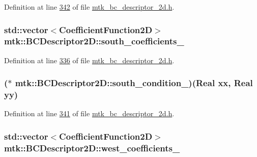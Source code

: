 Definition at line \hyperlink{mtk__bc__descriptor__2d_8h_source_l00342}{342} of file \hyperlink{mtk__bc__descriptor__2d_8h_source}{mtk\+\_\+bc\+\_\+descriptor\+\_\+2d.\+h}.

\hypertarget{classmtk_1_1BCDescriptor2D_a263309b9ad288dc89826d818d9378d07}{
\subsubsection[{south\+\_\+coefficients\+\_\+}]{\setlength{\rightskip}{0pt plus 5cm}std\+::vector$<${\bf Coefficient\+Function2\+D}$>$ mtk\+::\+B\+C\+Descriptor2\+D\+::south\+\_\+coefficients\+\_\+\hspace{0.3cm}{\ttfamily [private]}}}\label{classmtk_1_1BCDescriptor2D_a263309b9ad288dc89826d818d9378d07}


Definition at line \hyperlink{mtk__bc__descriptor__2d_8h_source_l00336}{336} of file \hyperlink{mtk__bc__descriptor__2d_8h_source}{mtk\+\_\+bc\+\_\+descriptor\+\_\+2d.\+h}.

\hypertarget{classmtk_1_1BCDescriptor2D_a2a933b473abbe47ad7c79ef7939e7768}{
\subsubsection[{south\+\_\+condition\+\_\+}]{($\ast$ mtk\+::\+B\+C\+Descriptor2\+D\+::south\+\_\+condition\+\_\+)({\bf Real} xx, {\bf Real} yy)\hspace{0.3cm}{\ttfamily [private]}}}\label{classmtk_1_1BCDescriptor2D_a2a933b473abbe47ad7c79ef7939e7768}


Definition at line \hyperlink{mtk__bc__descriptor__2d_8h_source_l00341}{341} of file \hyperlink{mtk__bc__descriptor__2d_8h_source}{mtk\+\_\+bc\+\_\+descriptor\+\_\+2d.\+h}.

\hypertarget{classmtk_1_1BCDescriptor2D_a7df71b43acc25c468683075cc7790bb2}{
\subsubsection[{west\+\_\+coefficients\+\_\+}]{\setlength{\rightskip}{0pt plus 5cm}std\+::vector$<${\bf Coefficient\+Function2\+D}$>$ mtk\+::\+B\+C\+Descriptor2\+D\+::west\+\_\+coefficients\+\_\+\hspace{0.3cm}{\ttfamily [private]}}}\label{classmtk_1_1BCDescriptor2D_a7df71b43acc25c468683075cc7790bb2}


